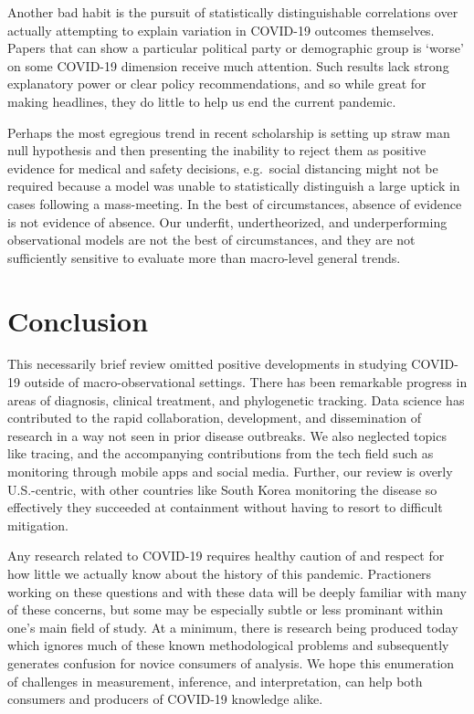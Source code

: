 \documentclass[10pt,letterpaper]{article}
\begin{document}
Another bad habit is the pursuit of statistically distinguishable
correlations over actually attempting to explain variation in COVID-19
outcomes themselves. Papers that can show a particular political party
or demographic group is `worse' on some COVID-19 dimension receive much
attention. Such results lack strong explanatory power or clear policy
recommendations, and so while great for making headlines, they do little
to help us end the current pandemic.

Perhaps the most egregious trend in recent scholarship is setting up
straw man null hypothesis and then presenting the inability to reject
them as positive evidence for medical and safety decisions, e.g.~social
distancing might not be required because a model was unable to
statistically distinguish a large uptick in cases following a
mass-meeting. In the best of circumstances, absence of evidence is not
evidence of absence. Our underfit, undertheorized, and underperforming
observational models are not the best of circumstances, and they are not
sufficiently sensitive to evaluate more than macro-level general trends.

\hypertarget{conclusion}{%
\section{Conclusion}\label{conclusion}}

This necessarily brief review omitted positive developments in studying
COVID-19 outside of macro-observational settings. There has been
remarkable progress in areas of diagnosis, clinical treatment, and
phylogenetic tracking. Data science has contributed to the rapid
collaboration, development, and dissemination of research in a way not
seen in prior disease outbreaks. We also neglected topics like tracing,
and the accompanying contributions from the tech field such as
monitoring through mobile apps and social media. Further, our review is
overly U.S.-centric, with other countries like South Korea monitoring
the disease so effectively they succeeded at containment without having
to resort to difficult mitigation.

Any research related to COVID-19 requires healthy caution of and respect
for how little we actually know about the history of this pandemic.
Practioners working on these questions and with these data will be
deeply familiar with many of these concerns, but some may be especially
subtle or less prominant within one's main field of study. At a minimum,
there is research being produced today which ignores much of these known
methodological problems and subsequently generates confusion for novice
consumers of analysis. We hope this enumeration of challenges in
measurement, inference, and interpretation, can help both consumers and
producers of COVID-19 knowledge alike.
\end{document}

